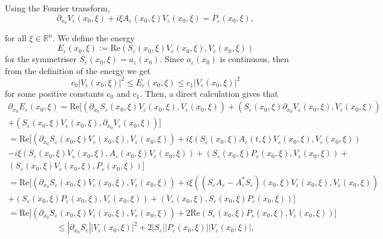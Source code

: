 \documentclass[12pt]{amsart}
\theoremstyle{definition}
\begin{document}
Using the Fourier transform,
\[
\partial_{x_0} V_\varepsilon(x_0, \xi) + i \xi A_\varepsilon(x_0, \xi) V_\varepsilon(x_0, \xi) = P_\varepsilon(x_0, \xi),
\]

for all $\xi \in \mathbb{R}^n$. We define the energy
\[
E_\varepsilon(x_0, \xi) := \mathrm{Re}(S_\varepsilon(x_0, \xi) V_\varepsilon(x_0, \xi), V_\varepsilon(x_0, \xi))
\]
for the symmetriser $S_\varepsilon(x_0, \xi) =  a_\varepsilon(x_0)$. Since $a_\varepsilon(x_0)$ is continuous, then from the definition of the energy we get
\begin{equation}
\label{eq3.12}
c_0 |V_\varepsilon(x_0, \xi)|^2 \leq E_\varepsilon(x_0, \xi) \leq c_1 |V_\varepsilon(x_0, \xi)|^2
\end{equation}
for some positive constants $c_0$ and $c_1$. Then, a direct calculation gives that
\begin{gather*}
\partial_{x_0} E_\varepsilon(x_0, \xi) = \mathrm{Re}\big[(\partial_{x_0} S_\varepsilon(x_0, \xi)V_\varepsilon(x_0, \xi), V_\varepsilon(x_0, \xi)) + (S_\varepsilon(x_0, \xi) \partial_{x_0} V_\varepsilon(x_0, \xi), V_\varepsilon(x_0, \xi))\\ + (S_\varepsilon(x_0, \xi) V_\varepsilon(x_0, \xi), \partial_{x_0} V_\varepsilon(x_0, \xi))\big]\\
= \mathrm{Re}\big[(\partial_{x_0} S_\varepsilon(x_0, \xi) V_\varepsilon(x_0, \xi), V_\varepsilon(x_0, \xi)) + i \xi (S_\varepsilon(x_0, \xi)A_\varepsilon(t, \xi)V_\varepsilon(x_0, \xi), V_\varepsilon(x_0, \xi))\\
- i \xi (S_\varepsilon(x_0, \xi)V_\varepsilon(x_0, \xi), A_\varepsilon(x_0, \xi) V_\varepsilon(x_0, \xi)) + (S_\varepsilon(x_0, \xi)P_\varepsilon(x_0, \xi), V_\varepsilon(x_0, \xi)) +\\ (S_\varepsilon(x_0, \xi)V_\varepsilon(x_0, \xi), P_\varepsilon(x_0, \xi))\big]\\
= \mathrm{Re}\big[(\partial_{x_0} S_\varepsilon(x_0, \xi)V_\varepsilon(x_0, \xi), V_\varepsilon(x_0, \xi)) + i \xi ((S_\varepsilon A_\varepsilon - A^*_\varepsilon S_\varepsilon)(x_0, \xi) V_\varepsilon(x_0, \xi), V_\varepsilon(x_0, \xi)) \\+ (S_\varepsilon(x_0, \xi)P_\varepsilon(x_0, \xi), V_\varepsilon(x_0, \xi)) + (V_\varepsilon(x_0, \xi), S_\varepsilon(x_0, \xi) P_\varepsilon(x_0, \xi))\big]\\ = \mathrm{Re}\big[(\partial_{x_0} S_\varepsilon(x_0, \xi)V_\varepsilon(x_0, \xi), V_\varepsilon(x_0, \xi)) + 2 \text{Re}(S_\varepsilon(x_0, \xi) P_\varepsilon(x_0, \xi), V_\varepsilon(x_0, \xi))\big]
\end{gather*}
\begin{equation}
\label{eq.3.13}
 \leq |\partial_{x_0} S_\varepsilon| |V_\varepsilon(x_0, \xi)|^2 + 2 |S_\varepsilon| |P_\varepsilon(x_0, \xi)| |V_\varepsilon(x_0, \xi)|,   
\end{equation}
\end{document}
